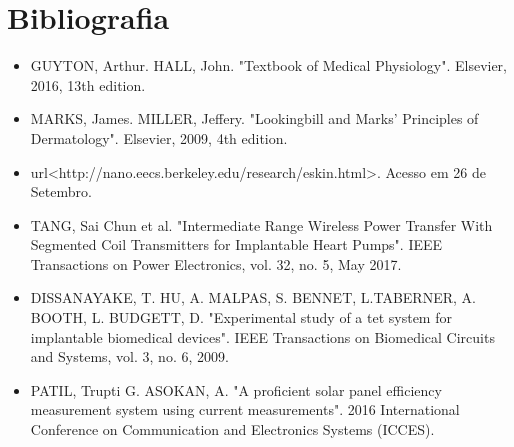 \documentclass[12pt, a4paper, twoside]{article}
\begin{document}
\section{Bibliografia}

\begin{itemize}
    \item GUYTON, Arthur. HALL, John. "Textbook of Medical Physiology". Elsevier, 2016, 13th edition.
    \item MARKS, James. MILLER, Jeffery. "Lookingbill and Marks' Principles of Dermatology". Elsevier, 2009, 4th edition.
    \item url<http://nano.eecs.berkeley.edu/research/eskin.html>. Acesso em 26 de Setembro.
    \item TANG, Sai Chun et al. "Intermediate Range Wireless Power Transfer With Segmented Coil Transmitters for Implantable Heart Pumps". IEEE Transactions on Power Electronics, vol. 32, no. 5, May 2017.
    \item DISSANAYAKE, T. HU, A. MALPAS, S. BENNET, L.TABERNER, A. BOOTH, L. BUDGETT, D. "Experimental study of a tet system for implantable biomedical devices". IEEE Transactions on Biomedical Circuits and Systems, vol. 3, no. 6, 2009.
    \item PATIL, Trupti G. ASOKAN, A. "A proficient solar panel efficiency measurement system using current measurements". 2016 International Conference on Communication and Electronics Systems (ICCES).
\end{itemize}
\end{document}
